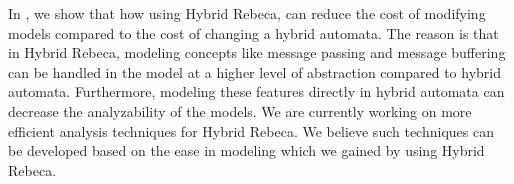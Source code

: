 In \cite{HRebcaSoSym}, we  show that how using Hybrid Rebeca, can reduce the cost of  modifying models compared to the cost of changing a   hybrid automata.
The reason is that  in Hybrid Rebeca, modeling concepts like message passing and message buffering can be handled in the model at a higher level of abstraction compared to hybrid automata. Furthermore, modeling these features
directly in hybrid automata can  decrease the analyzability of the models. %
We are currently working on more efficient analysis techniques for Hybrid Rebeca. We believe such techniques  can be developed based on the ease in modeling which we gained  by using Hybrid Rebeca. 